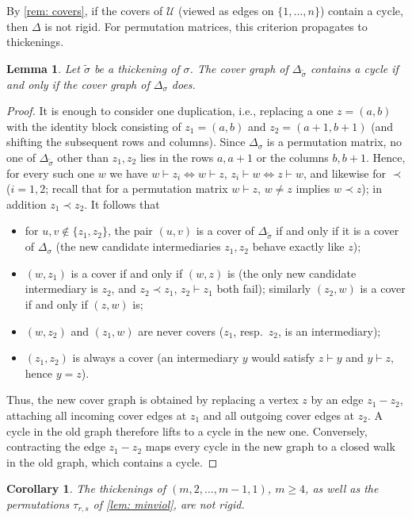 \documentclass[12pt]{article}
\newtheorem{lemma}[theorem]{Lemma}
\newtheorem{corollary}[theorem]{Corollary}
\newcommand{\U}{\mathcal{U}}
\newcommand{\IM}{\Delta}
\newcommand{\homr}{\vdash}
\newcommand{\extr}{\prec}
\begin{document}
By \cref{rem: covers}, if the covers of $\U$ (viewed as edges on $\{1,\dots,n\}$) contain a cycle, then $\IM$ is not rigid.
For permutation matrices, this criterion propagates to thickenings.

\begin{lemma} \label{lem: thickcycle}
Let $\widetilde\sigma$ be a thickening of $\sigma$.  The cover graph of
$\IM_{\widetilde\sigma}$ contains a cycle if and only if the cover graph of
$\IM_\sigma$ does. 
\end{lemma}

\begin{proof}
It is enough to consider one duplication, i.e., replacing a one $z=(a,b)$ with the identity block consisting of $z_1=(a,b)$ and $z_2=(a+1,b+1)$ (and shifting the
subsequent rows and columns). Since $\IM_\sigma$ is a permutation matrix, no one of $\IM_{\tilde\sigma}$ other than
$z_1,z_2$ lies in the rows $a,a+1$ or the columns $b,b+1$. Hence, for every such one $w$ we have
$w\homr z_i\iff w\homr z$, $z_i\homr w\iff z\homr w$, and likewise for $\extr$ ($i=1,2$; recall that for a
permutation matrix $w\homr z$, $w\ne z$ implies $w\extr z$); in addition $z_1\extr z_2$. It follows that
\begin{itemize}
\item for $u,v\notin\{z_1,z_2\}$, the pair $(u,v)$ is a cover of $\IM_{\tilde\sigma}$ if and only if it is a cover of
$\IM_\sigma$ (the new candidate intermediaries $z_1,z_2$ behave exactly like $z$);
\item $(w,z_1)$ is a cover if and only if $(w,z)$ is (the only new candidate intermediary is $z_2$, and
$z_2\extr z_1$, $z_2\homr z_1$ both fail); similarly $(z_2,w)$ is a cover if and only if $(z,w)$ is;
\item $(w,z_2)$ and $(z_1,w)$ are never covers ($z_1$, resp.\ $z_2$, is an intermediary);
\item $(z_1,z_2)$ is always a cover (an intermediary $y$ would satisfy $z\homr y$ and $y\homr z$, hence $y=z$).
\end{itemize}
Thus, the new cover graph is obtained by replacing a vertex $z$ by an edge $z_1-z_2$, attaching
all incoming cover edges at $z_1$ and all outgoing cover edges at $z_2$.  A cycle in the
old graph therefore lifts to a cycle in the new one.  Conversely, contracting the edge
$z_1-z_2$ maps every cycle in the new graph to a closed walk in the old graph, which
contains a cycle.
\end{proof}

\begin{corollary} \label{cor: families12}
The thickenings of $(m,2,\dots,m-1,1)$, $m\ge4$, as well as the permutations $\tau_{r,s}$ of \cref{lem: minviol}, are not rigid.
\end{corollary}
\end{document}
